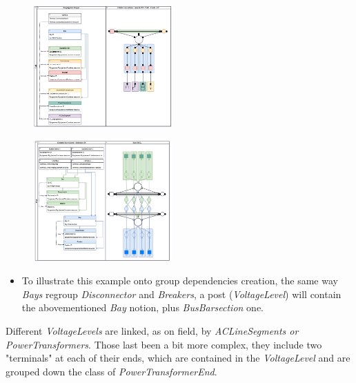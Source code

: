   \begin{figure}[ht]
    \centering
    \parbox[t]{0.475\textwidth}{
    {\centering
    \includegraphics[width=0.475\textwidth]{0.figuras/Cellule_BTS_accroches.png}}
    \label{fig:Bay_BusbarSection}
    }
    \hfill
    \parbox[t]{0.475\textwidth}{
    {\centering
    \includegraphics[width=0.475\textwidth]{0.figuras/Union_DJ-SA-Barre.png}}
    \label{fig:Breakers}
    }
\end{figure}

\begin{itemize}[label={}]
        \begin{itemize}
\item To illustrate this example onto group dependencies creation, the same way \textit{Bays} regroup \textit{Disconnector} and \textit{Breakers}, a post (\textit{VoltageLevel}) will contain the abovementioned \textit{Bay} notion, plus \textit{BusBarsection} one. 
\end{itemize}
\end{itemize}


\begin{itemize}[label={}]
        \begin{itemize}[label={}]
 Different \textit{VoltageLevels} are linked, as on field, by \textit{ACLineSegments or PowerTransformers}. Those last been a bit more complex, they include two "terminals" at each of their ends, which are contained in the \textit{VoltageLevel} and are grouped down the class of \textit{PowerTransformerEnd}. 
\end{itemize}
\end{itemize}

